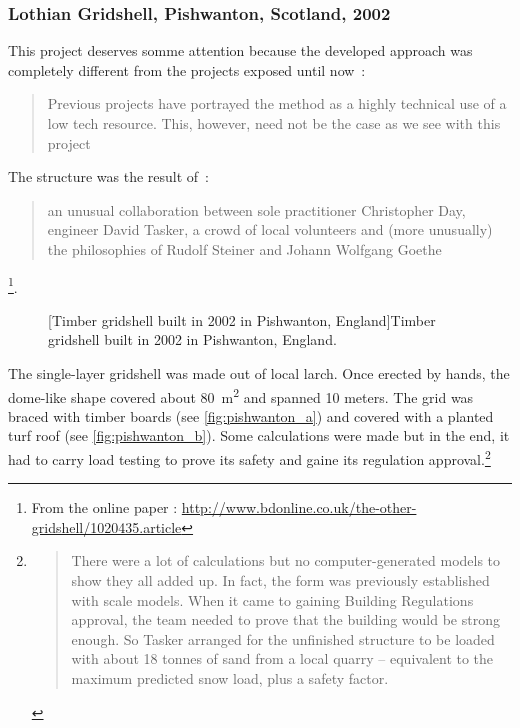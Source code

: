 \subsubsection{Lothian Gridshell, Pishwanton, Scotland, 2002}
This project deserves somme attention because the developed approach was completely different from the projects exposed until now~: \blockcquote[]{Lowenstein2002}{Previous projects have portrayed the method as a highly technical use of a low tech resource. This, however, need not be the case as we see with this project \belp{}}. The structure was the result of~: \blockcquote[]{bdonline2002}{\belp{} an unusual collaboration between sole practitioner Christopher Day, engineer David Tasker, a crowd of local volunteers and (more unusually) the philosophies of Rudolf Steiner and Johann Wolfgang Goethe}.\footnote{From the online paper  : \url{http://www.bdonline.co.uk/the-other-gridshell/1020435.article}}.
 \begin{figure}[h]
		\hspace*{\fill}
		\vspace{10pt}
		[Timber gridshell built in 2002 in Pishwanton, England]{Timber gridshell built in 2002 in Pishwanton, England.}
		\label{fig:pishwanton} 
\end{figure}

The single-layer gridshell was made out of local larch. Once erected by hands, the dome-like shape covered about \SI{80}{m^2} and spanned 10 meters. The grid was braced with timber boards (see \cref{fig:pishwanton_a}) and covered with a planted turf roof (see \cref{fig:pishwanton_b}). Some calculations were made but in the end, it had to carry load testing to prove its safety and gaine its regulation approval.\footnote{\blockcquote[]{bdonline2002}{There were a lot of calculations but no computer-generated models to show they all added up. In fact, the form was previously established with scale models. When it came to gaining Building Regulations approval, the team needed to prove that the building would be strong enough. So Tasker arranged for the unfinished structure to be loaded with about 18 tonnes of sand from a local quarry – equivalent to the maximum predicted snow load, plus a safety factor.}}

